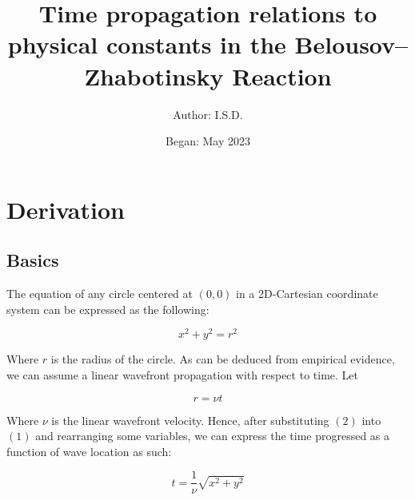 \documentclass{article}
\title{Time propagation relations to physical constants in the Belousov–Zhabotinsky Reaction}
\author{Author: I.S.D.}
\date{Began: May 2023}
\begin{document}
\maketitle


\section{Derivation}
\subsection{Basics}

The equation of any circle centered at $(0,0)$ in a 2D-Cartesian coordinate system can be expressed as the following:

\begin{equation}
    x^{2} + y^{2} = r^{2}
\end{equation}

Where $r$ is the radius of the circle. As can be deduced from empirical evidence, we can assume a linear wavefront propagation with respect to time. 
Let

\begin{equation}
    r = \nu t
\end{equation}

Where $\nu$ is the linear wavefront velocity. 
Hence, after substituting $(2)$ into $(1)$ and rearranging some variables, we can express the time progressed as a function of wave location as such:

\begin{equation}
    t = \frac{1}{\nu}\sqrt{x^{2} + y^{2}}
\end{equation}

\end{document}
